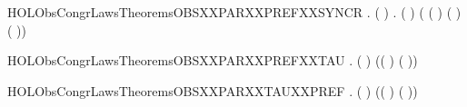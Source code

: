 \begin{SaveVerbatim}{HOLObsCongrLawsTheoremsOBSXXPARXXPREFXXSYNCR}
\HOLTokenTurnstile{} \HOLSymConst{\HOLTokenForall{}} .
       ( \HOLSymConst{=}  ) \HOLSymConst{\HOLTokenImp{}}
       \HOLSymConst{\HOLTokenForall{}} .
            (  \HOLSymConst{\ensuremath{\parallel}}  )
             ( ( \HOLSymConst{\ensuremath{\parallel}}  ) \HOLSymConst{+}
               (  \HOLSymConst{\ensuremath{\parallel}} ) \HOLSymConst{+} \HOLConst{\ensuremath{\tau}}( \HOLSymConst{\ensuremath{\parallel}} ))
\end{SaveVerbatim}
\newcommand{\HOLObsCongrLawsTheoremsOBSXXPARXXPREFXXSYNCR}{\UseVerbatim{HOLObsCongrLawsTheoremsOBSXXPARXXPREFXXSYNCR}}
\begin{SaveVerbatim}{HOLObsCongrLawsTheoremsOBSXXPARXXPREFXXTAU}
\HOLTokenTurnstile{} \HOLSymConst{\HOLTokenForall{}}  .
        ( \HOLSymConst{\ensuremath{\parallel}} \HOLConst{\ensuremath{\tau}})
         (( \HOLSymConst{\ensuremath{\parallel}} \HOLConst{\ensuremath{\tau}}) \HOLSymConst{+} \HOLConst{\ensuremath{\tau}}( \HOLSymConst{\ensuremath{\parallel}} ))
\end{SaveVerbatim}
\newcommand{\HOLObsCongrLawsTheoremsOBSXXPARXXPREFXXTAU}{\UseVerbatim{HOLObsCongrLawsTheoremsOBSXXPARXXPREFXXTAU}}
\begin{SaveVerbatim}{HOLObsCongrLawsTheoremsOBSXXPARXXTAUXXPREF}
\HOLTokenTurnstile{} \HOLSymConst{\HOLTokenForall{}}  .
        (\HOLConst{\ensuremath{\tau}} \HOLSymConst{\ensuremath{\parallel}} )
         (\HOLConst{\ensuremath{\tau}}( \HOLSymConst{\ensuremath{\parallel}} ) \HOLSymConst{+} (\HOLConst{\ensuremath{\tau}} \HOLSymConst{\ensuremath{\parallel}} ))
\end{SaveVerbatim}
